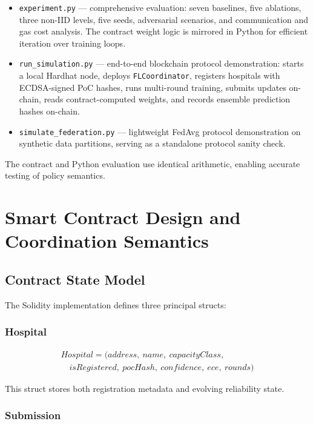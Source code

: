 \documentclass[conference]{IEEEtran}
\begin{document}
\begin{itemize}
\item \texttt{experiment.py} --- comprehensive evaluation: seven baselines, five ablations, three non-IID levels, five seeds, adversarial scenarios, and communication and gas cost analysis. The contract weight logic is mirrored in Python for efficient iteration over training loops.
\item \texttt{run\_simulation.py} --- end-to-end blockchain protocol demonstration: starts a local Hardhat node, deploys \texttt{FLCoordinator}, registers hospitals with ECDSA-signed PoC hashes, runs multi-round training, submits updates on-chain, reads contract-computed weights, and records ensemble prediction hashes on-chain.
\item \texttt{simulate\_federation.py} --- lightweight FedAvg protocol demonstration on synthetic data partitions, serving as a standalone protocol sanity check.
\end{itemize}

The contract and Python evaluation use identical arithmetic, enabling accurate testing of policy semantics.

\section{Smart Contract Design and Coordination Semantics}

\subsection{Contract State Model}

The Solidity implementation defines three principal structs:

\subsubsection{Hospital}

\begin{multline}
Hospital=(address,\ name,\ capacityClass,\\
\quad isRegistered,\ pocHash,\ confidence,\ ece,\ rounds)
\end{multline}

This struct stores both registration metadata and evolving reliability state.

\subsubsection{Submission}
\end{document}
